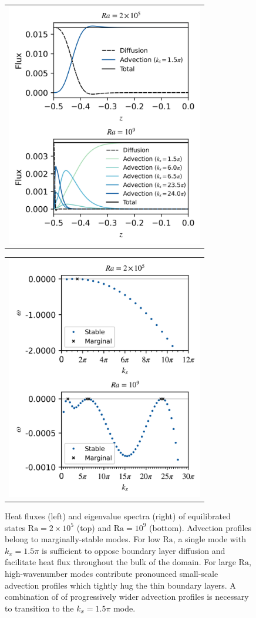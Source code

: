 \documentclass[reprint,amsmath,amssymb,aps]{revtex4-1}
\newcommand\Ra{\mathrm{Ra}}
\begin{document}
\begin{figure}
    \centering
    \begin{tabular}{@{}c@{}}
        \includegraphics[width=3.4in]{flux_sup_n.png}
    \end{tabular}
    \begin{tabular}{@{}c@{}}
        \includegraphics[width=3.4in]{EV_spectra_2ra.png}
    \end{tabular}
    \caption{Heat fluxes (left) and eigenvalue spectra (right) of equilibrated states $\Ra = 2 \times 10^5$ (top) and $\Ra = 10^9$ (bottom). 
    Advection profiles belong to marginally-stable modes. 
    For low $\Ra$, a single mode with $k_x = 1.5\pi$ is sufficient to oppose boundary layer diffusion and facilitate heat flux throughout the bulk of the domain. 
    For large $\Ra$, high-wavenumber modes contribute pronounced small-scale advection profiles which tightly hug the thin boundary layers. 
    A combination of of progressively wider advection profiles is necessary to transition to the $k_x = 1.5\pi$ mode.}
    \label{fig:flux}
\end{figure}
\end{document}
